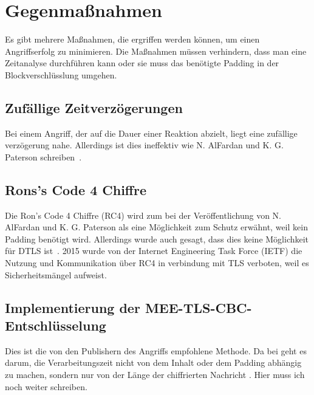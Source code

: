 \documentclass[a4paper,10pt]{scrartcl}
\begin{document}
    \section{Gegenmaßnahmen}\label{sec:gegenmanahmen}
    Es gibt mehrere Maßnahmen, die ergriffen werden können, um einen Angriffserfolg zu minimieren.
    Die Maßnahmen müssen verhindern, dass man eine Zeitanalyse durchführen kann oder sie muss das benötigte Padding in der Blockverschlüsslung umgehen.

    \subsection{Zufällige Zeitverzögerungen}\label{subsec:zufallige-zeitverzogerungen}
    Bei einem Angriff, der auf die Dauer einer Reaktion abzielt, liegt eine zufällige verzögerung nahe.
    Allerdings ist dies ineffektiv wie N. AlFardan und K. G. Paterson schreiben~\cite[S.13]{AlFardan2013}.

    \subsection{Rons's Code 4 Chiffre}\label{subsec:rons's-code-4-chiffre}
    Die Ron's Code 4 Chiffre (RC4) wird zum bei der Veröffentlichung von N. AlFardan und K. G. Paterson als eine Möglichkeit zum Schutz erwähnt, weil kein Padding benötigt wird.
    Allerdings wurde auch gesagt, dass dies keine Möglichkeit für DTLS ist~\cite[S.13]{AlFardan2013}.
    2015 wurde von der Internet Engineering Task Force (IETF)  die Nutzung und Kommunikation über RC4 in verbindung mit TLS verboten, weil es Sicherheitsmängel aufweist.

    \subsection{Implementierung der MEE-TLS-CBC-Entschlüsselung}\label{subsec:implementierung-der-mee-tls-cbc-entschlusselung}
    Dies ist die von den Publishern des Angriffs empfohlene Methode.
    Da bei geht es darum, die Verarbeitungszeit nicht von dem Inhalt oder dem Padding abhängig zu machen, sondern nur von der Länge der chiffrierten Nachricht \cite[s.13]{AlFardan2013}.
    Hier muss ich noch weiter schreiben.

    \newpage

    
\end{document}
